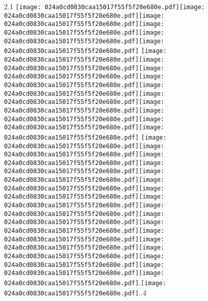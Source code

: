 \documentclass{article}
\newcommand{\origpg}[2]{\texttt{[image: 024a0cd0830caa15017f55f5f20e680e.pdf]}}
\begin{document}
{\vspace{0.626pt}\hspace{36.161pt}2.1 \origpg2{145.74pt 647.73pt 157.39pt 663.87pt}\origpg2{157.3pt 647.73pt 164.46pt 663.87pt}\hspace{-0.178pt}\origpg2{164.28pt 647.73pt 172.92pt 663.87pt}\origpg2{172.92pt 647.73pt 180.99pt 663.87pt}\origpg2{180.91pt 647.73pt 188.53pt 663.87pt}\origpg2{188.61pt 647.73pt 199.45pt 663.87pt} \origpg2{203.3pt 647.73pt 211.37pt 663.87pt}\origpg2{211.46pt 647.73pt 218.63pt 663.87pt}\hspace{-0.178pt}\origpg2{218.45pt 647.73pt 230.88pt 663.87pt}\origpg2{230.96pt 647.73pt 238.13pt 663.87pt}\hspace{-0.178pt}\origpg2{237.95pt 647.73pt 245pt 663.87pt}\hspace{-0.307pt}\origpg2{86mm 647.73pt 252.77pt 663.87pt}\hspace{-0.597pt}\origpg2{252.17pt 647.73pt 260.29pt 663.87pt}\origpg2{260.33pt 647.73pt 268.97pt 663.87pt}\origpg2{268.97pt 647.73pt 279.82pt 663.87pt}\origpg2{279.82pt 647.73pt 287.89pt 663.87pt} \origpg2{291.87pt 647.73pt 302.09pt 663.87pt}\origpg2{301.99pt 647.73pt 310.06pt 663.87pt}\hspace{-0.597pt}\origpg2{309.47pt 647.73pt 317.68pt 663.87pt}\origpg2{317.68pt 647.73pt 324.85pt 663.87pt}\hspace{-0.21pt}\origpg2{324.64pt 647.73pt 332.69pt 663.87pt}\origpg2{332.6pt 647.73pt 339.76pt 663.87pt}\hspace{-0.178pt}\origpg2{339.58pt 647.73pt 348.22pt 663.87pt}\hspace{0.263pt}\origpg2{348.48pt 647.73pt 364.62pt 663.87pt}\hspace{0.226pt}\origpg2{364.85pt 647.73pt 380.99pt 663.87pt}\origpg2{380.99pt 647.73pt 397.13pt 663.87pt}\origpg2{397.13pt 647.73pt 413.27pt 663.87pt}\origpg2{413.27pt 647.73pt 429.41pt 663.87pt}\hspace{-0.242pt}\origpg2{429.17pt 647.73pt 445.31pt 663.87pt}\origpg2{445.31pt 647.73pt 461.45pt 663.87pt}\origpg2{461.45pt 647.73pt 477.59pt 663.87pt}\hspace{-0.242pt}\origpg2{477.35pt 647.73pt 493.49pt 663.87pt}\origpg2{493.49pt 647.73pt 509.63pt 663.87pt}.\hspace{-0.181pt}\origpg2{513.55pt 647.73pt 529.69pt 663.87pt}..4 

}
\end{document}
